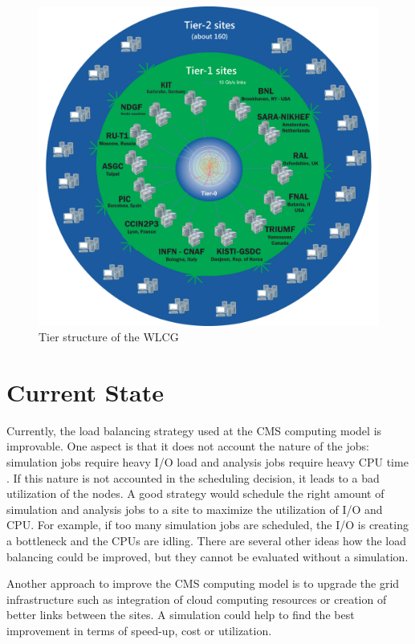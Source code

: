 	\begin{figure}[t!]
		\centering
		\includegraphics[width=0.9\linewidth]{images/WLCG}
		\caption[]{Tier structure of the WLCG \cite{wlcg_tiers}}
		\label{fig:wlcg}
	\end{figure}
	

\section{Current State}
Currently, the load balancing strategy used at the CMS computing model is improvable.
One aspect is that it does not account the nature of the jobs: simulation jobs require heavy I/O load and analysis jobs require heavy CPU time \cite{1742-6596-331-7-072038}. If this nature is not accounted in the scheduling decision, it leads to a bad utilization of the nodes. A good strategy would schedule the right amount of simulation and analysis jobs to a site to maximize the utilization of I/O and CPU. For example, if too many simulation jobs are scheduled, the I/O is creating a bottleneck and the CPUs are idling. There are several other ideas how the load balancing could be improved, but they cannot be evaluated without a simulation.

Another approach to improve the CMS computing model is to upgrade the grid infrastructure such as integration of cloud computing resources or creation of better links between the sites. A simulation could help to find the best improvement in terms of speed-up, cost or utilization.


